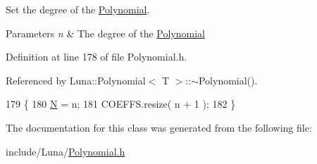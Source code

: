 Set the degree of the \hyperlink{classLuna_1_1Polynomial}{Polynomial}. 


\begin{DoxyParams}{Parameters}
{\em n} & The degree of the \hyperlink{classLuna_1_1Polynomial}{Polynomial} \\
\hline
\end{DoxyParams}


Definition at line 178 of file Polynomial.\+h.



Referenced by Luna\+::\+Polynomial$<$ T $>$\+::$\sim$\+Polynomial().


\begin{DoxyCode}
179     \{
180         \hyperlink{namespaceHeat__plot_a7d050092798e28458a263710837bda77}{N} = n;
181         COEFFS.resize( n + 1 );
182     \}
\end{DoxyCode}


The documentation for this class was generated from the following file\+:\begin{DoxyCompactItemize}
\item 
include/\+Luna/\hyperlink{Polynomial_8h}{Polynomial.\+h}\end{DoxyCompactItemize}
